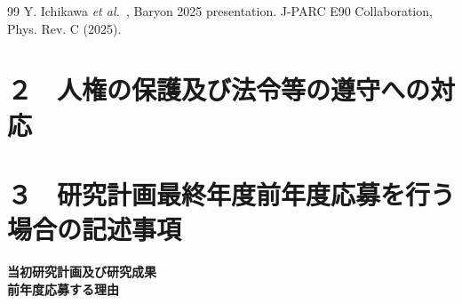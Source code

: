 \documentclass[11pt,a4j,dvipdfmx]{jarticle} 					%
\newcommand{\研究課題名}{加速器実験による短距離バリオン間相互作用の解明と中性子星ハイペロンパズルの解決}
\newcommand{\研究機関名}{東北大学}
\newcommand{\研究代表者氏名}{市川裕大}
\newcommand{\研究期間の最終元号年度}{13}  %
\newcommand{\etal}{\textit{et al.\ }}
\begin{document}
	\begin{thebibliography}{99}
		 Y. Ichikawa \etal, Baryon 2025 presentation.
		 J-PARC E90 Collaboration, Phys. Rev. C (2025).
	\end{thebibliography}




\section{２　人権の保護及び法令等の遵守への対応}






\section{３　研究計画最終年度前年度応募を行う場合の記述事項}

\newcommand{\最終年度研究種目名}{基盤研究（）}
\newcommand{\最終年度研究課題番号}{?????}
\newcommand{\最終年度研究課題名}{}
\newcommand{\最終年度研究期間}{令和？？年度〜令和\一年目 年度}


\noindent
\textbf{当初研究計画及び研究成果}\\



\noindent
\textbf{前年度応募する理由}\\

\end{document}
